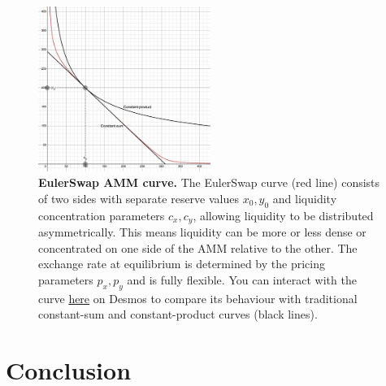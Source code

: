 \documentclass{article}
\begin{document}
 \begin{figure}[h]  %
    \centering  %
    \includegraphics[width=0.5\textwidth]{curve.png} %
    \caption{\textbf{EulerSwap AMM curve.} The EulerSwap curve (red line) consists of two sides with separate reserve values $x_0, y_0$ and liquidity concentration parameters $c_x, c_y$, allowing liquidity to be distributed asymmetrically. This means liquidity can be more or less dense or concentrated on one side of the AMM relative to the other. The exchange rate at equilibrium is determined by the pricing parameters $p_x, p_y$ and is fully flexible. You can interact with the curve \href{https://www.desmos.com/calculator/gzwmvbs1dk}{here} on Desmos to compare its behaviour with traditional constant-sum and constant-product curves (black lines).}
    \label{fig:fig1}  %
\end{figure}

\section{Conclusion}
\end{document}
